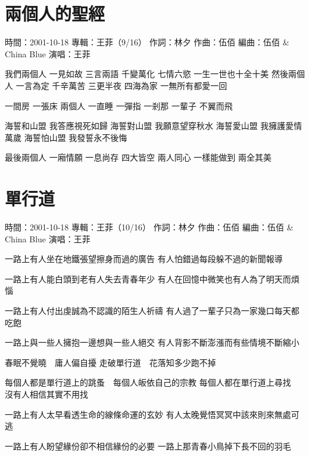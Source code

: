 \documentclass[UTF8,a4paper,oneside,twocolumn,12pt]{ctexbook}
\newcommand{\infopair}[2]{\textbullet #1：#2}
\newcommand{\zc}[1][伍佰]{\infopair{作詞}{#1}}
\newcommand{\zq}[1][伍佰]{\infopair{作曲}{#1}}
\newcommand{\bq}[1][伍佰]{\infopair{編曲}{#1}}
\newcommand{\zj}[1]{\infopair{專輯}{#1}}
\newcommand{\sj}[1]{\infopair{時間}{#1}}
\newenvironment{info}{\begin{flushleft}\kaishu
	}
	{\end{flushleft}\normalsize\yahei\par}
\newenvironment{lyric}{
	}
{}
\begin{document}
\section{兩個人的聖經}
\begin{info}
	\sj{2001-10-18}
	\zj{王菲（9/16）}
	\zc[林夕]
	\zq
	\bq[伍佰 \& China Blue]
	\infopair{演唱}{王菲}
\end{info}
\begin{lyric}
	我們兩個人 一見如故 三言兩語
	千變萬化 七情六慾 一生一世也十全十美
	然後兩個人 一言為定 千辛萬苦
	三更半夜 四海為家 一無所有都愛一回

	一間房 一張床 兩個人 一直睡
	一彈指 一剎那 一輩子 不翼而飛

	海誓和山盟 我答應視死如歸
	海誓對山盟 我願意望穿秋水
	海誓愛山盟 我擁護愛情萬歲
	海誓怕山盟 我發誓永不後悔

	最後兩個人 一廂情願 一息尚存
	四大皆空 兩人同心 一樣能做到 兩全其美
\end{lyric}

\section{單行道}
\begin{info}
	\sj{2001-10-18}
	\zj{王菲（10/16）}
	\zc[林夕]
	\zq
	\bq[伍佰 \& China Blue]
	\infopair{演唱}{王菲}
\end{info}
\begin{lyric}
	一路上有人坐在地鐵張望擦身而過的廣告
	有人怕錯過每段躲不過的新聞報導

	一路上有人能白頭到老有人失去青春年少
	有人在回憶中微笑也有人為了明天而煩惱

	一路上有人付出虔誠為不認識的陌生人祈禱
	有人過了一輩子只為一家幾口每天都吃飽

	一路上與一些人擁抱一邊想與一些人絕交
	有人背影不斷澎漲而有些情境不斷縮小

	春眠不覺曉　庸人偏自擾
	走破單行道　花落知多少跑不掉

	每個人都是單行道上的跳蚤　每個人皈依自己的宗教
	每個人都在單行道上尋找　沒有人相信其實不用找

	一路上有人太早看透生命的線條命運的玄妙
	有人太晚覺悟冥冥中該來則來無處可逃

	一路上有人盼望緣份卻不相信緣份的必要
	一路上那青春小鳥掉下長不回的羽毛
\end{lyric}
\end{document}
